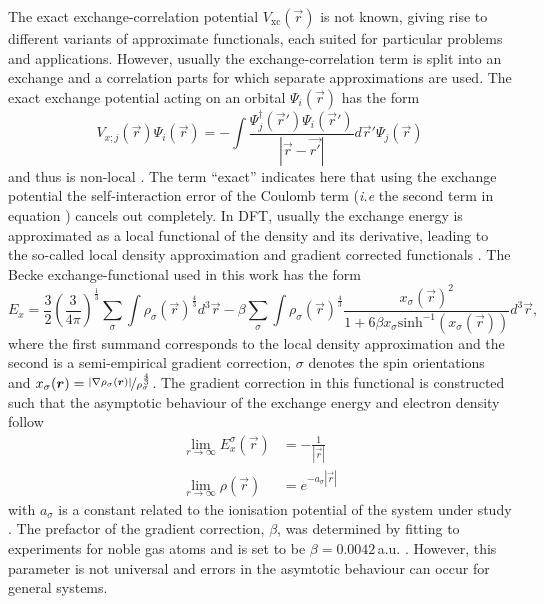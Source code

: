 The exact exchange-correlation potential $V_\text{xc}(\vec{r})$ is not known, giving rise to different variants of approximate functionals, each suited for particular problems and applications.
However, usually the exchange-correlation term is split into an exchange and a correlation parts for which separate approximations are used.
The exact exchange potential acting on an orbital $\Psi_i(\vec{r})$ has the form
\begin{equation} \label{eq:HF_exch}
V_{x;j}(\vec{r})\Psi_i(\vec{r}) =-\int \frac{\Psi_j^\dagger(\vec{r}') \Psi_i(\vec{r}')}{\left|\vec{r}-\vec{r'}\right|} d\vec{r}' \Psi_j(\vec{r})
\end{equation}
and thus is non-local \cite{Holthausen}.
The term ``exact'' indicates here that using the exchange potential  the self-interaction error of the Coulomb term (\textit{i.e} the second term in equation ) cancels out completely.
In DFT, usually the exchange energy is approximated as a local functional of the density and its derivative, leading to the so-called local density approximation and gradient corrected functionals \cite{baerRSH}.
The Becke \cite{blyp} exchange-functional used in this work has the form
\begin{equation} \label{eq:blypXC}
E_x=\frac 32 \left(\frac{3}{4\pi}\right)^\frac 13 \sum_\sigma \int \rho_\sigma(\vec{r})^\frac 43 d^3\vec{r} 
-\beta \sum_\sigma \int \rho_\sigma(\vec{r})^\frac 43 \frac{x_\sigma(\vec{r})^2}{1+6\beta x_\sigma \text{sinh}^{-1}( x_\sigma (\vec{r}))} d^3\vec{r},
\end{equation}
where the first summand corresponds to the local density approximation and the second is a semi-empirical gradient correction, $\sigma$ denotes the spin orientations and $x_\sigma(\vec{r})=\nicefrac{|\nabla \rho_\sigma(\vec{r})|}{\rho_\sigma^\frac 43}$. 
The gradient correction in this functional is constructed such that the asymptotic behaviour of the exchange energy and electron density follow
\begin{align} \label{eq:dftAsympt}
  \lim_{r\rightarrow\infty} E_x^\sigma(\vec{r}) & =-\frac{1}{|\vec{r}|} \\
  \lim_{r\rightarrow\infty} \rho(\vec{r}) & =e^{-a_\sigma |\vec{r}|}
\end{align}
with $a_\sigma$ is a constant related to the ionisation potential of the system under study \cite{blyp}.
The prefactor of the gradient correction, $\beta$, was determined by fitting to experiments for noble gas atoms and is set to be $\beta=0.0042$\,a.u. \cite{blyp}.
However, this parameter is not universal and errors in the asymtotic behaviour  can occur for general systems.

